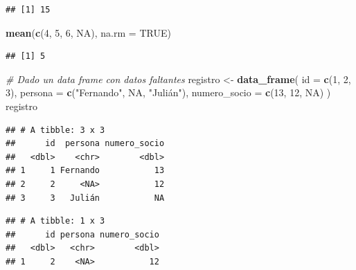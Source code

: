 \documentclass[]{book}
\newenvironment{Shaded}{\begin{snugshade}}{\end{snugshade}}
\newcommand{\KeywordTok}[1]{\textcolor[rgb]{0.13,0.29,0.53}{\textbf{#1}}}
\newcommand{\DataTypeTok}[1]{\textcolor[rgb]{0.13,0.29,0.53}{#1}}
\newcommand{\DecValTok}[1]{\textcolor[rgb]{0.00,0.00,0.81}{#1}}
\newcommand{\StringTok}[1]{\textcolor[rgb]{0.31,0.60,0.02}{#1}}
\newcommand{\CommentTok}[1]{\textcolor[rgb]{0.56,0.35,0.01}{\textit{#1}}}
\newcommand{\OtherTok}[1]{\textcolor[rgb]{0.56,0.35,0.01}{#1}}
\newcommand{\OperatorTok}[1]{\textcolor[rgb]{0.81,0.36,0.00}{\textbf{#1}}}
\newcommand{\NormalTok}[1]{#1}
\theoremstyle{definition}
\theoremstyle{definition}
\theoremstyle{definition}
\theoremstyle{remark}
\begin{document}
\begin{verbatim}
## [1] 15
\end{verbatim}

\begin{Shaded}
\begin{Highlighting}[]
\KeywordTok{mean}\NormalTok{(}\KeywordTok{c}\NormalTok{(}\DecValTok{4}\NormalTok{, }\DecValTok{5}\NormalTok{, }\DecValTok{6}\NormalTok{, }\OtherTok{NA}\NormalTok{), }\DataTypeTok{na.rm =} \OtherTok{TRUE}\NormalTok{)}
\end{Highlighting}
\end{Shaded}

\begin{verbatim}
## [1] 5
\end{verbatim}

\begin{Shaded}
\begin{Highlighting}[]
\CommentTok{# Dado un data frame con datos faltantes}
\NormalTok{registro <-}\StringTok{ }\KeywordTok{data_frame}\NormalTok{(}
  \DataTypeTok{id =} \KeywordTok{c}\NormalTok{(}\DecValTok{1}\NormalTok{, }\DecValTok{2}\NormalTok{, }\DecValTok{3}\NormalTok{),}
  \DataTypeTok{persona =} \KeywordTok{c}\NormalTok{(}\StringTok{"Fernando"}\NormalTok{, }\OtherTok{NA}\NormalTok{, }\StringTok{"Julián"}\NormalTok{),}
  \DataTypeTok{numero_socio =} \KeywordTok{c}\NormalTok{(}\DecValTok{13}\NormalTok{, }\DecValTok{12}\NormalTok{, }\OtherTok{NA}\NormalTok{)}
\NormalTok{)}
\NormalTok{registro}
\end{Highlighting}
\end{Shaded}

\begin{verbatim}
## # A tibble: 3 x 3
##      id  persona numero_socio
##   <dbl>    <chr>        <dbl>
## 1     1 Fernando           13
## 2     2     <NA>           12
## 3     3   Julián           NA
\end{verbatim}

\begin{Shaded}
\end{Shaded}

\begin{verbatim}
## # A tibble: 1 x 3
##      id persona numero_socio
##   <dbl>   <chr>        <dbl>
## 1     2    <NA>           12
\end{verbatim}
\end{document}

